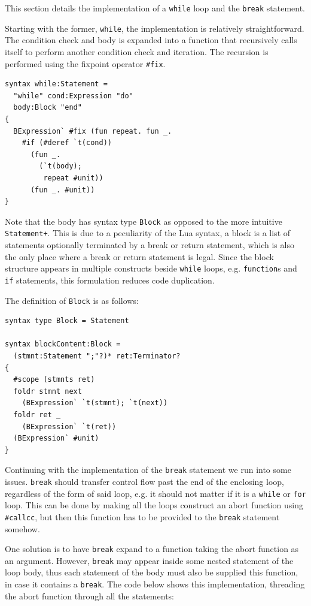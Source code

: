 \documentclass{kththesis}
\begin{document}
This section details the implementation of a \texttt{while} loop and the \texttt{break} statement.

Starting with the former, \texttt{while}, the implementation is relatively straightforward. The condition check and body is expanded into a function that recursively calls itself to perform another condition check and iteration. The recursion is performed using the fixpoint operator \texttt{#fix}.

\begin{verbatim}
syntax while:Statement =
  "while" cond:Expression "do"
  body:Block "end"
{
  BExpression` #fix (fun repeat. fun _.
    #if (#deref `t(cond))
      (fun _.
        (`t(body);
         repeat #unit))
      (fun _. #unit))
}
\end{verbatim}

Note that the body has syntax type \texttt{Block} as opposed to the more intuitive \texttt{Statement+}. This is due to a peculiarity of the Lua syntax, a block is a list of statements optionally terminated by a break or return statement, which is also the only place where a break or return statement is legal. Since the block structure appears in multiple constructs beside \texttt{while} loops, e.g. \texttt{function}s and \texttt{if} statements, this formulation reduces code duplication.

The definition of \texttt{Block} is as follows:

\begin{verbatim}
syntax type Block = Statement

syntax blockContent:Block =
  (stmnt:Statement ";"?)* ret:Terminator?
{
  #scope (stmnts ret)
  foldr stmnt next
    (BExpression` `t(stmnt); `t(next))
  foldr ret _
    (BExpression` `t(ret))
  (BExpression` #unit)
}
\end{verbatim}

Continuing with the implementation of the \texttt{break} statement we run into some issues. \texttt{break} should transfer control flow past the end of the enclosing loop, regardless of the form of said loop, e.g. it should not matter if it is a \texttt{while} or \texttt{for} loop. This can be done by making all the loops construct an abort function using \texttt{#callcc}, but then this function has to be provided to the \texttt{break} statement somehow.

One solution is to have \texttt{break} expand to a function taking the abort function as an argument. However, \texttt{break} may appear inside some nested statement of the loop body, thus each statement of the body must also be supplied this function, in case it contains a \texttt{break}. The code below shows this implementation, threading the abort function through all the statements:
\end{document}
